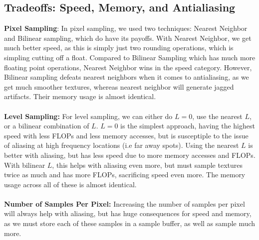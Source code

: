 \documentclass{article}
\begin{document}
\subsection{Tradeoffs: Speed, Memory, and Antialiasing}
\textbf{Pixel Sampling}: In pixel sampling, we used two techniques: Nearest Neighbor and Bilinear sampling, which do have its payoffs. With Nearest Neighbor, we get much better speed, as this is simply just two rounding operations, which is simpling cutting off a float. Compared to Bilinear Sampling which has much more floating point operations, Nearest Neighbor wins in the speed category. However, Bilinear sampling defeats nearest neighbors when it comes to antialiasing, as we get much smoother textures, whereas nearest neighbor will generate jagged artifacts. Their memory usage is almost identical.
\\
\\
\textbf{Level Sampling: } For level sampling, we can either do $L = 0$, use the nearest $L$, or a bilinear combination of $L$. $L = 0$ is the simplest approach, having the highest speed with less FLOPs and less memory accesses, but is susceptiple to the issue of aliasing at high frequency locations (i.e far away spots). Using the nearest $L$ is better with aliasing, but has less speed due to more memory accesses and FLOPs. With bilinear $L$, this helps with aliasing even more, but must sample textures twice as much and has more FLOPs, sacrificing speed even more. The memory usage across all of these is almost identical.
\\
\\
\textbf{Number of Samples Per Pixel: } Increasing the number of samples per pixel will always help with aliasing, but has huge consequences for speed and memory, as we must store each of these samples in a sample buffer, as well as sample much more.
\end{document}
